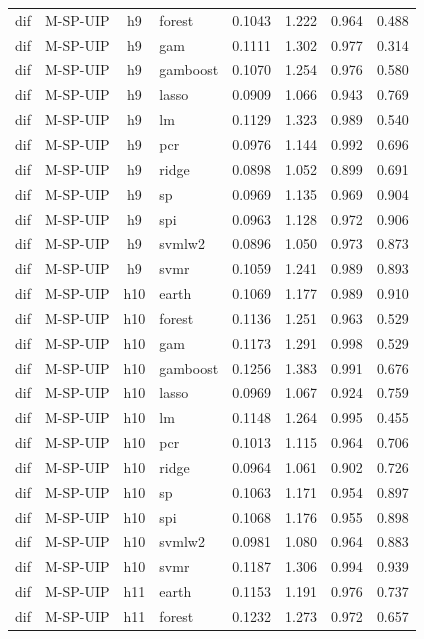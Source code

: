 \begin{ThreePartTable}
\begin{longtable}[t]{llclcccc}
dif & M-SP-UIP & h9 & forest & 0.1043 & 1.222 & 0.964 & 0.488\\
dif & M-SP-UIP & h9 & gam & 0.1111 & 1.302 & 0.977 & 0.314\\
dif & M-SP-UIP & h9 & gamboost & 0.1070 & 1.254 & 0.976 & 0.580\\
dif & M-SP-UIP & h9 & lasso & 0.0909 & 1.066 & 0.943 & 0.769\\
dif & M-SP-UIP & h9 & lm & 0.1129 & 1.323 & 0.989 & 0.540\\
dif & M-SP-UIP & h9 & pcr & 0.0976 & 1.144 & 0.992 & 0.696\\
dif & M-SP-UIP & h9 & ridge & 0.0898 & 1.052 & 0.899 & 0.691\\
dif & M-SP-UIP & h9 & sp & 0.0969 & 1.135 & 0.969 & 0.904\\
dif & M-SP-UIP & h9 & spi & 0.0963 & 1.128 & 0.972 & 0.906\\
dif & M-SP-UIP & h9 & svmlw2 & 0.0896 & 1.050 & 0.973 & 0.873\\
dif & M-SP-UIP & h9 & svmr & 0.1059 & 1.241 & 0.989 & 0.893\\
\addlinespace
dif & M-SP-UIP & h10 & earth & 0.1069 & 1.177 & 0.989 & 0.910\\
dif & M-SP-UIP & h10 & forest & 0.1136 & 1.251 & 0.963 & 0.529\\
dif & M-SP-UIP & h10 & gam & 0.1173 & 1.291 & 0.998 & 0.529\\
dif & M-SP-UIP & h10 & gamboost & 0.1256 & 1.383 & 0.991 & 0.676\\
dif & M-SP-UIP & h10 & lasso & 0.0969 & 1.067 & 0.924 & 0.759\\
dif & M-SP-UIP & h10 & lm & 0.1148 & 1.264 & 0.995 & 0.455\\
dif & M-SP-UIP & h10 & pcr & 0.1013 & 1.115 & 0.964 & 0.706\\
dif & M-SP-UIP & h10 & ridge & 0.0964 & 1.061 & 0.902 & 0.726\\
dif & M-SP-UIP & h10 & sp & 0.1063 & 1.171 & 0.954 & 0.897\\
dif & M-SP-UIP & h10 & spi & 0.1068 & 1.176 & 0.955 & 0.898\\
dif & M-SP-UIP & h10 & svmlw2 & 0.0981 & 1.080 & 0.964 & 0.883\\
dif & M-SP-UIP & h10 & svmr & 0.1187 & 1.306 & 0.994 & 0.939\\
\addlinespace
dif & M-SP-UIP & h11 & earth & 0.1153 & 1.191 & 0.976 & 0.737\\
dif & M-SP-UIP & h11 & forest & 0.1232 & 1.273 & 0.972 & 0.657\\

\end{longtable}
\end{ThreePartTable}
